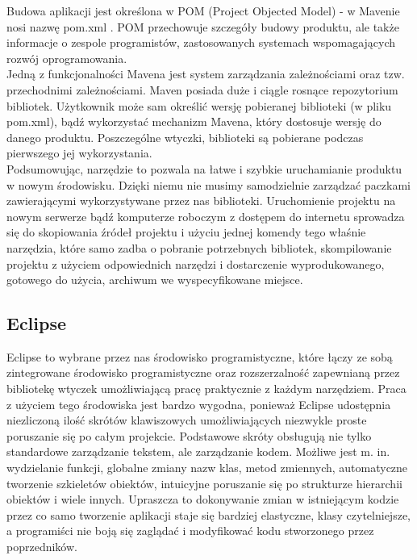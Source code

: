 \documentclass[licencjacka]{pracamgr}
\begin{document}
Budowa aplikacji jest określona w POM (Project Objected Model) - w Mavenie nosi nazwę pom.xml . 
POM przechowuje szczegóły budowy produktu, ale także  informacje o zespole programistów, zastosowanych systemach wspomagających rozwój oprogramowania.\\

Jedną z funkcjonalności Mavena jest system zarządzania zależnościami oraz tzw. przechodnimi zależnościami.
Maven posiada duże i ciągle rosnące repozytorium bibliotek. Użytkownik może sam określić wersję pobieranej biblioteki (w pliku pom.xml), bądź wykorzystać mechanizm Mavena, 
który dostosuje wersję do danego produktu. Poszczególne wtyczki, biblioteki są pobierane podczas pierwszego jej wykorzystania.  \\

Podsumowując, narzędzie to pozwala na łatwe i szybkie uruchamianie produktu w nowym środowisku. Dzięki niemu nie musimy samodzielnie zarządzać paczkami zawierającymi wykorzystywane przez nas biblioteki. Uruchomienie projektu na nowym serwerze bądź komputerze roboczym z dostępem do internetu sprowadza się do skopiowania źródeł projektu i użyciu jednej komendy tego właśnie narzędzia, które samo zadba o pobranie potrzebnych bibliotek, skompilowanie projektu z użyciem odpowiednich narzędzi i dostarczenie wyprodukowanego, gotowego do użycia, archiwum we wyspecyfikowane miejsce.
\subsection{Eclipse}

Eclipse to wybrane przez nas środowisko programistyczne, które łączy ze sobą zintegrowane środowisko programistyczne oraz rozszerzalność zapewnianą przez bibliotekę wtyczek umożliwiającą pracę praktycznie z każdym narzędziem. Praca z użyciem tego środowiska jest bardzo wygodna, ponieważ Eclipse udostępnia niezliczoną ilość skrótów klawiszowych umożliwiających niezwykle proste poruszanie się po całym projekcie. Podstawowe skróty obsługują nie tylko standardowe zarządzanie tekstem, ale zarządzanie kodem. Możliwe jest m. in. wydzielanie funkcji, globalne zmiany nazw klas, metod zmiennych, automatyczne tworzenie szkieletów obiektów, intuicyjne poruszanie się po strukturze hierarchii obiektów i wiele innych. Upraszcza to dokonywanie zmian w istniejącym kodzie przez co samo tworzenie aplikacji staje się bardziej elastyczne, klasy czytelniejsze, a programiści nie boją się zaglądać i modyfikować kodu stworzonego przez poprzedników.
\end{document}
